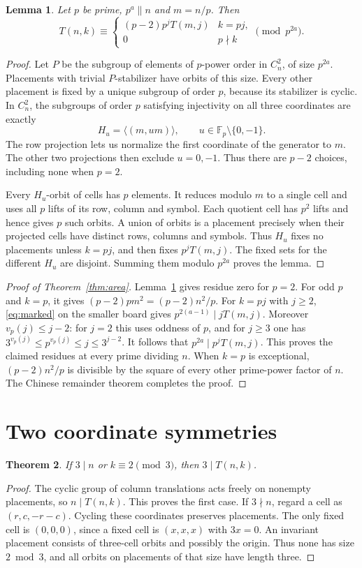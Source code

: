 \documentclass[11pt]{article}
\newtheorem{theorem}{Theorem}
\newtheorem{lemma}[theorem]{Lemma}
\newcommand{\F}{\mathbb F}
\begin{document}
\begin{lemma}\label{lem:prime}
Let $p$ be prime, $p^a\parallel n$ and $m=n/p$. Then
\[
T(n,k)\equiv\begin{cases}(p-2)p^jT(m,j) & k=pj,\\0 & p\nmid k\end{cases}\pmod {p^{2a}}.
\]
\end{lemma}
\begin{proof}
Let $P$ be the subgroup of elements of $p$-power order in $C_n^2$, of size $p^{2a}$. Placements with trivial $P$-stabilizer have orbits of this size. Every other placement is fixed by a unique subgroup of order $p$, because its stabilizer is cyclic. In $C_n^2$, the subgroups of order $p$ satisfying injectivity on all three coordinates are exactly
\[
H_u=\langle(m,um)\rangle,\qquad u\in\F_p\setminus\{0,-1\}.
\]
The row projection lets us normalize the first coordinate of the generator to $m$. The other two projections then exclude $u=0,-1$. Thus there are $p-2$ choices, including none when $p=2$.

Every $H_u$-orbit of cells has $p$ elements. It reduces modulo $m$ to a single cell and uses all $p$ lifts of its row, column and symbol. Each quotient cell has $p^2$ lifts and hence gives $p$ such orbits. A union of orbits is a placement precisely when their projected cells have distinct rows, columns and symbols. Thus $H_u$ fixes no placements unless $k=pj$, and then fixes $p^jT(m,j)$. The fixed sets for the different $H_u$ are disjoint. Summing them modulo $p^{2a}$ proves the lemma.
\end{proof}
\begin{proof}[Proof of Theorem~\ref{thm:area}]
Lemma~\ref{lem:prime} gives residue zero for $p=2$. For odd $p$ and $k=p$, it gives $(p-2)p m^2=(p-2)n^2/p$. For $k=pj$ with $j\ge2$, \eqref{eq:marked} on the smaller board gives $p^{2(a-1)}\mid jT(m,j)$. Moreover $v_p(j)\le j-2$: for $j=2$ this uses oddness of $p$, and for $j\ge3$ one has $3^{v_p(j)}\le p^{v_p(j)}\le j\le 3^{j-2}$. It follows that $p^{2a}\mid p^jT(m,j)$. This proves the claimed residues at every prime dividing $n$. When $k=p$ is exceptional, $(p-2)n^2/p$ is divisible by the square of every other prime-power factor of $n$. The Chinese remainder theorem completes the proof.
\end{proof}

\section{Two coordinate symmetries}
\begin{theorem}\label{thm:three}
If $3\mid n$ or $k\equiv2\pmod3$, then $3\mid T(n,k)$.
\end{theorem}
\begin{proof}
The cyclic group of column translations acts freely on nonempty placements, so $n\mid T(n,k)$. This proves the first case. If $3\nmid n$, regard a cell as $(r,c,-r-c)$. Cycling these coordinates preserves placements. The only fixed cell is $(0,0,0)$, since a fixed cell is $(x,x,x)$ with $3x=0$. An invariant placement consists of three-cell orbits and possibly the origin. Thus none has size $2\bmod3$, and all orbits on placements of that size have length three.
\end{proof}
\end{document}
